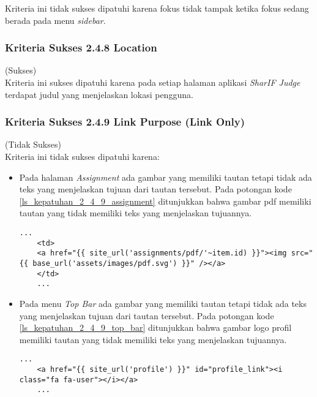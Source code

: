 Kriteria ini tidak sukses dipatuhi karena fokus tidak tampak ketika fokus sedang berada pada menu \textit{sidebar}.

\subsubsection{Kriteria Sukses 2.4.8 Location}
\label{subsubsec:kepatuhan_kriteria_2.4.8}
(Sukses) \\

Kriteria ini sukses dipatuhi karena pada setiap halaman aplikasi \textit{SharIF Judge} terdapat judul yang menjelaskan lokasi pengguna.

\subsubsection{Kriteria Sukses 2.4.9 Link Purpose (Link Only)}
\label{subsubsec:kepatuhan_kriteria_2.4.9}
(Tidak Sukses) \\

Kriteria ini tidak sukses dipatuhi karena:
\begin{itemize}
	\item Pada halaman \textit{Assignment} ada gambar yang memiliki tautan tetapi tidak ada teks yang menjelaskan tujuan dari tautan tersebut. Pada potongan kode \ref{ls_kepatuhan_2_4_9_assignment} ditunjukkan bahwa gambar pdf memiliki tautan yang tidak memiliki teks yang menjelaskan tujuannya.
	\begin{lstlisting}[basicstyle=\ttfamily, frame=single,
	columns=fullflexible, keepspaces=true, breaklines=true, label=ls_kepatuhan_2_4_9_assignment, caption=Kriteria Sukses 2.4.9 - Gambar PDF]
	...
	<td>
	<a href="{{ site_url('assignments/pdf/'~item.id) }}"><img src="{{ base_url('assets/images/pdf.svg') }}" /></a>
	</td>
	...
	\end{lstlisting}
	
	\item Pada menu \textit{Top Bar} ada gambar yang memiliki tautan tetapi tidak ada teks yang menjelaskan tujuan dari tautan tersebut. Pada potongan kode \ref{ls_kepatuhan_2_4_9_top_bar} ditunjukkan bahwa gambar logo profil memiliki tautan yang tidak memiliki teks yang menjelaskan tujuannya.
	\begin{lstlisting}[basicstyle=\ttfamily, frame=single,
	columns=fullflexible, keepspaces=true, breaklines=true, label=ls_kepatuhan_2_4_9_top_bar, caption=Kriteria Sukses 2.4.9 - Gambar Logo Profile]
	...
	<a href="{{ site_url('profile') }}" id="profile_link"><i class="fa fa-user"></i></a>
	...
	\end{lstlisting}
	
\end{itemize}

